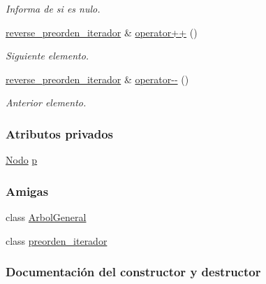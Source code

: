 \begin{DoxyCompactItemize}
\begin{DoxyCompactList}\small\item\em Informa de si es nulo. \end{DoxyCompactList}\item 
\hyperlink{classArbolGeneral_1_1reverse__preorden__iterador}{reverse\+\_\+preorden\+\_\+iterador} \& \hyperlink{classArbolGeneral_1_1reverse__preorden__iterador_a46a546c134ae2d7fe7bc41e16227eb1f}{operator++} ()
\begin{DoxyCompactList}\small\item\em Siguiente elemento. \end{DoxyCompactList}\item 
\hyperlink{classArbolGeneral_1_1reverse__preorden__iterador}{reverse\+\_\+preorden\+\_\+iterador} \& \hyperlink{classArbolGeneral_1_1reverse__preorden__iterador_abe501ae99cd71b927e21f882ec4bfec6}{operator-\/-\/} ()
\begin{DoxyCompactList}\small\item\em Anterior elemento. \end{DoxyCompactList}\end{DoxyCompactItemize}
\subsubsection*{Atributos privados}
\begin{DoxyCompactItemize}
\item 
\hyperlink{classArbolGeneral_a12cc1b74a9095d89bc7334290d332f7a}{Nodo} \hyperlink{classArbolGeneral_1_1reverse__preorden__iterador_a002862fdee453a84b037e5dd26c071a2}{p}
\end{DoxyCompactItemize}
\subsubsection*{Amigas}
\begin{DoxyCompactItemize}
\item 
class \hyperlink{classArbolGeneral_1_1reverse__preorden__iterador_a9c06e31b7c3e0d4ee5b03003d32935a5}{Arbol\+General}
\item 
class \hyperlink{classArbolGeneral_1_1reverse__preorden__iterador_a4aa0da8bfbc320a8daff98451ee65b6c}{preorden\+\_\+iterador}
\end{DoxyCompactItemize}


\subsubsection{Documentación del constructor y destructor}
\hypertarget{classArbolGeneral_1_1reverse__preorden__iterador_a80a523317a7f93ef2359d16048d7bd7e}{}\label{classArbolGeneral_1_1reverse__preorden__iterador_a80a523317a7f93ef2359d16048d7bd7e} 
